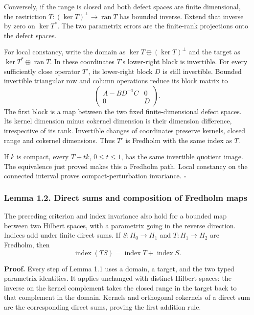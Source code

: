 \documentclass[
  11pt,
]{article}
\begin{document}
Conversely, if the range is closed and both defect spaces are finite
dimensional, the restriction \(T:(\ker T)^\perp\to\operatorname{ran}T\)
has bounded inverse. Extend that inverse by zero on \(\ker T^*\). The
two parametrix errors are the finite-rank projections onto the defect
spaces.

For local constancy, write the domain as \(\ker T\oplus(\ker T)^\perp\)
and the target as \(\ker T^*\oplus\operatorname{ran}T\). In these
coordinates \(T\)'s lower-right block is invertible. For every
sufficiently close operator \(T'\), its lower-right block \(D\) is still
invertible. Bounded invertible triangular row and column operations
reduce its block matrix to \[
\begin{pmatrix}A-BD^{-1}C&0\\0&D\end{pmatrix}.
\] The first block is a map between the two fixed finite-dimensional
defect spaces. Its kernel dimension minus cokernel dimension is their
dimension difference, irrespective of its rank. Invertible changes of
coordinates preserve kernels, closed range and cokernel dimensions. Thus
\(T'\) is Fredholm with the same index as \(T\).

If \(k\) is compact, every \(T+tk\), \(0\leq t\leq1\), has the same
invertible quotient image. The equivalence just proved makes this a
Fredholm path. Local constancy on the connected interval proves
compact-perturbation invariance. \(\square\)

\subsubsection{Lemma 1.2. Direct sums and composition of Fredholm
maps}\label{lemma-1.2.-direct-sums-and-composition-of-fredholm-maps}

The preceding criterion and index invariance also hold for a bounded map
between two Hilbert spaces, with a parametrix going in the reverse
direction. Indices add under finite direct sums. If \(S:H_0\to H_1\) and
\(T:H_1\to H_2\) are Fredholm, then \[
\operatorname{index}(TS)
=\operatorname{index}T+\operatorname{index}S.
\]

\textbf{Proof.} Every step of Lemma 1.1 uses a domain, a target, and the
two typed parametrix identities. It applies unchanged with distinct
Hilbert spaces: the inverse on the kernel complement takes the closed
range in the target back to that complement in the domain. Kernels and
orthogonal cokernels of a direct sum are the corresponding direct sums,
proving the first addition rule.
\end{document}
